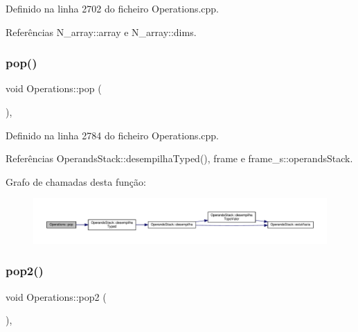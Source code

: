 Definido na linha 2702 do ficheiro Operations.\+cpp.



Referências N\+\_\+array\+::array e N\+\_\+array\+::dims.

\mbox{\label{classOperations_a30b8a646cbfac3712f4b339364bd31b1}} 
\subsubsection{\texorpdfstring{pop()}{pop()}}
{\footnotesize\ttfamily void Operations\+::pop (\begin{DoxyParamCaption}{ }\end{DoxyParamCaption})\hspace{0.3cm}{\ttfamily [static]}, {\ttfamily [private]}}



Definido na linha 2784 do ficheiro Operations.\+cpp.



Referências Operands\+Stack\+::desempilha\+Typed(), frame e frame\+\_\+s\+::operands\+Stack.

Grafo de chamadas desta função\+:\nopagebreak
\begin{figure}[H]
\begin{center}
\leavevmode
\includegraphics[width=350pt]{classOperations_a30b8a646cbfac3712f4b339364bd31b1_cgraph}
\end{center}
\end{figure}
\mbox{\label{classOperations_a54e578f7f27df39f8c516ec93195e219}} 
\subsubsection{\texorpdfstring{pop2()}{pop2()}}
{\footnotesize\ttfamily void Operations\+::pop2 (\begin{DoxyParamCaption}{ }\end{DoxyParamCaption})\hspace{0.3cm}{\ttfamily [static]}, {\ttfamily [private]}}



